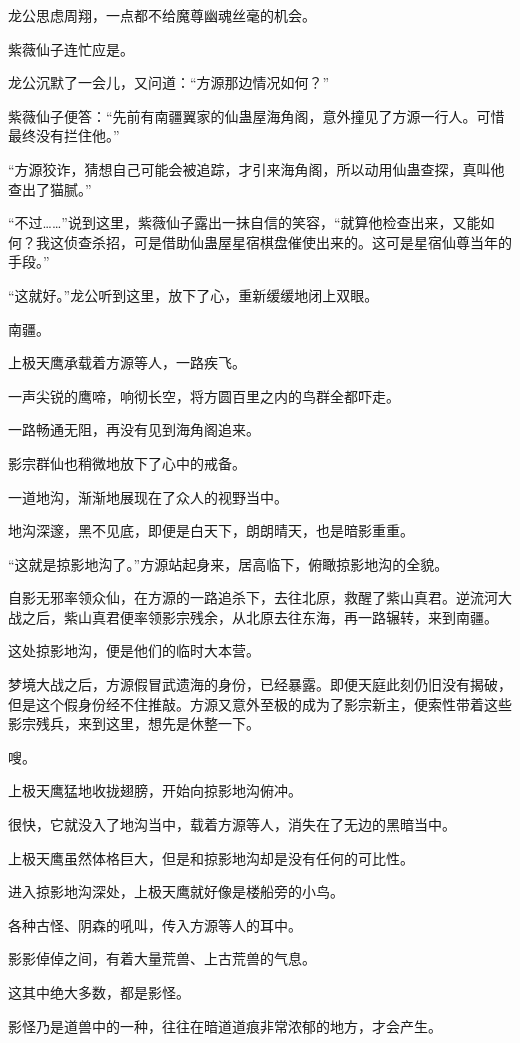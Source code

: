 \begin{this_body}
龙公思虑周翔，一点都不给魔尊幽魂丝毫的机会。

紫薇仙子连忙应是。

龙公沉默了一会儿，又问道：“方源那边情况如何？”

紫薇仙子便答：“先前有南疆翼家的仙蛊屋海角阁，意外撞见了方源一行人。可惜最终没有拦住他。”

“方源狡诈，猜想自己可能会被追踪，才引来海角阁，所以动用仙蛊查探，真叫他查出了猫腻。”

“不过……”说到这里，紫薇仙子露出一抹自信的笑容，“就算他检查出来，又能如何？我这侦查杀招，可是借助仙蛊屋星宿棋盘催使出来的。这可是星宿仙尊当年的手段。”

“这就好。”龙公听到这里，放下了心，重新缓缓地闭上双眼。

南疆。

上极天鹰承载着方源等人，一路疾飞。

一声尖锐的鹰啼，响彻长空，将方圆百里之内的鸟群全都吓走。

一路畅通无阻，再没有见到海角阁追来。

影宗群仙也稍微地放下了心中的戒备。

一道地沟，渐渐地展现在了众人的视野当中。

地沟深邃，黑不见底，即便是白天下，朗朗晴天，也是暗影重重。

“这就是掠影地沟了。”方源站起身来，居高临下，俯瞰掠影地沟的全貌。

自影无邪率领众仙，在方源的一路追杀下，去往北原，救醒了紫山真君。逆流河大战之后，紫山真君便率领影宗残余，从北原去往东海，再一路辗转，来到南疆。

这处掠影地沟，便是他们的临时大本营。

梦境大战之后，方源假冒武遗海的身份，已经暴露。即便天庭此刻仍旧没有揭破，但是这个假身份经不住推敲。方源又意外至极的成为了影宗新主，便索性带着这些影宗残兵，来到这里，想先是休整一下。

嗖。

上极天鹰猛地收拢翅膀，开始向掠影地沟俯冲。

很快，它就没入了地沟当中，载着方源等人，消失在了无边的黑暗当中。

上极天鹰虽然体格巨大，但是和掠影地沟却是没有任何的可比性。

进入掠影地沟深处，上极天鹰就好像是楼船旁的小鸟。

各种古怪、阴森的吼叫，传入方源等人的耳中。

影影倬倬之间，有着大量荒兽、上古荒兽的气息。

这其中绝大多数，都是影怪。

影怪乃是道兽中的一种，往往在暗道道痕非常浓郁的地方，才会产生。


\end{this_body}
